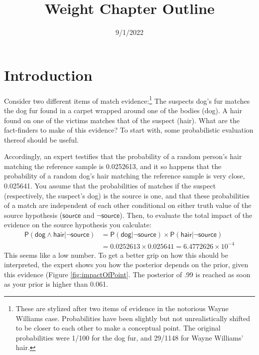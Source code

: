 \documentclass[
  10pt,
  dvipsnames,enabledeprecatedfontcommands]{scrartcl}
\title{Weight Chapter Outline}
\author{}
\date{\vspace{-2.5em}9/1/2022}
\newcommand{\pr}[1]{\mathsf{P}(#1)}
\newcommand{\s}[1]{\mbox{$\mathsf{#1}$}}
\begin{document}
\maketitle

{
\hypersetup{linkcolor=}
\setcounter{tocdepth}{2}
\tableofcontents
}
\hypertarget{introduction}{%
\section{Introduction}\label{introduction}}

Consider two different items of match evidence:\footnote{These are
  stylized after two items of evidence in the notorious Wayne Williams
  case. Probabilities have been slightly but not unrealistically shifted
  to be closer to each other to make a conceptual point. The original
  probabilities were 1/100 for the dog fur, and 29/1148 for Wayne
  Williams' hair.} The suspects dog's fur matches the dog fur found in a
carpet wrapped around one of the bodies (\textsf{dog}). A hair found on
one of the victims matches that of the suspect (\textsf{hair}). What are
the fact-finders to make of this evidence? To start with, some
probabilistic evaluation thereof should be useful.

Accordingly, an expert testifies that the probability of a random
person's hair matching the reference sample is 0.0252613, and it so
happens that the probability of a random dog's hair matching the
reference sample is very close, 0.025641. You assume that the
probabilities of matches if the suspect (respectively, the suspect's
dog) is the source is one, and that these probabilities of a match are
independent of each other conditional on either truth value of the
source hypothesis (\(\mathsf{source}\) and \(\neg \mathsf{source}\)).
Then, to evaluate the total impact of the evidence on the source
hypothesis you calculate: \begin{align*}
\pr{\s{dog}\wedge \s{hair} \vert \neg \s{source}} & = \pr{\s{dog} \vert \neg \s{source}} \times \pr{\s{hair} \vert \neg \s{source}} \\
& =  0.0252613 \times  0.025641 = \ensuremath{6.4772626\times 10^{-4}}
\end{align*} This seems like a low number. To get a better grip on how
this should be interpreted, the expert shows you how the posterior
depends on the prior, given this evidence (Figure
\ref{fig:impactOfPoint}. The posterior of .99 is reached as soon as your
prior is higher than 0.061.
\end{document}
